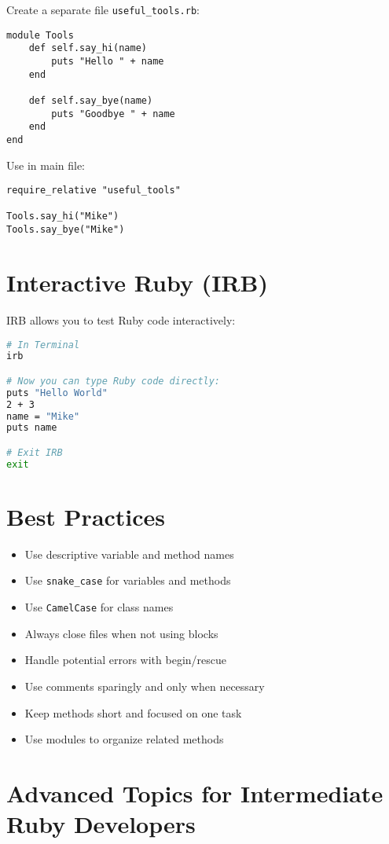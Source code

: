 \documentclass[12pt,a4paper]{article}
\begin{document}
Create a separate file \texttt{useful\_tools.rb}:

\begin{lstlisting}
module Tools
    def self.say_hi(name)
        puts "Hello " + name
    end
    
    def self.say_bye(name)
        puts "Goodbye " + name
    end
end
\end{lstlisting}

Use in main file:

\begin{lstlisting}
require_relative "useful_tools"

Tools.say_hi("Mike")
Tools.say_bye("Mike")
\end{lstlisting}

\section{Interactive Ruby (IRB)}

IRB allows you to test Ruby code interactively:

\begin{lstlisting}[language=bash]
# In Terminal
irb

# Now you can type Ruby code directly:
puts "Hello World"
2 + 3
name = "Mike"
puts name

# Exit IRB
exit
\end{lstlisting}

\section{Best Practices}

\begin{itemize}
    \item Use descriptive variable and method names
    \item Use \texttt{snake\_case} for variables and methods
    \item Use \texttt{CamelCase} for class names
    \item Always close files when not using blocks
    \item Handle potential errors with begin/rescue
    \item Use comments sparingly and only when necessary
    \item Keep methods short and focused on one task
    \item Use modules to organize related methods
\end{itemize}

\section{Advanced Topics for Intermediate Ruby Developers}
\end{document}
